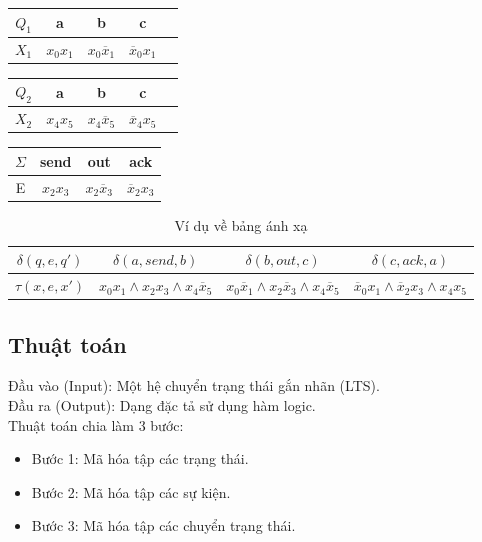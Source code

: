 \documentclass{article}
\begin{document}
\begin{flushleft}
\begin{table}[!ht]
				\centering
				\renewcommand{\arraystretch}{1.25}
				\begin{tabular}{|c|c|c|c|c|}
					\hline
					$Q_1$ & a & b & c\\
					\hline
					$X_1$ & $x_0x_1$ & $x_0\overline x_1$& $\overline x_0x_1$\\
					\hline
				\end{tabular}
				\begin{tabular}{|c|c|c|c|c|}
					\hline
					$Q_2$ & a & b & c\\
					\hline
					$X_2$ & $x_4x_5$ & $x_4\overline x_5$& $\overline x_4x_5$\\
					\hline
				\end{tabular}
			\end{table}
			\begin{table}[!ht]
				\centering
				\renewcommand{\arraystretch}{1.25}
				\begin{tabular}{|c|c|c|c|}
					\hline
					$\Sigma$ & send & out & ack\\
					\hline
					E & $x_2x_3$ & $x_2\overline x_3$& $\overline x_2x_3$ \\
					\hline
				\end{tabular}
			\end{table}
			\begin{table}[!ht]
				\centering
				\renewcommand{\arraystretch}{1.25}
				\begin{tabular}{|c|c|c|c|}
					\hline
					$\delta(q, e, q')$ & $\delta(a, send, b)$ & $\delta(b, out, c)$ & $\delta(c, ack, a)$\\
					\hline
					$\tau(x, e, x')$ & $x_0x_1 \land x_2x_3 \land x_4\overline x_5$ & $x_0\overline x_1 \land x_2 \overline x_3 \land x_4 \overline x_5$ & $\overline x_0 x_1 \land \overline x_2 x_3 \land x_4x_5$ \\
					\hline
				\end{tabular}
				\caption{Ví dụ về bảng ánh xạ}
			\end{table}				
		\subsection{Thuật toán}
		Đầu vào (Input): Một hệ chuyển trạng thái gắn nhãn (LTS).\\
		Đầu ra (Output): Dạng đặc tả sử dụng hàm logic.\\
		Thuật toán chia làm 3 bước:
		
		\begin{itemize}
			\item Bước 1: Mã hóa tập các trạng thái.
			\item Bước 2: Mã hóa tập các sự kiện.
			\item Bước 3: Mã hóa tập các chuyển trạng thái.
		\end{itemize}
		

\end{flushleft}
\end{document}
